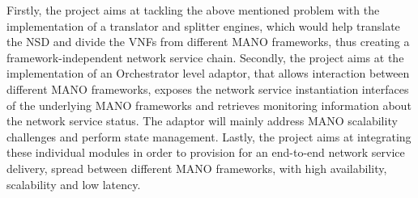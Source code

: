 Firstly, the project aims at tackling the above mentioned problem with the implementation of a translator and splitter engines, which would help translate the NSD and divide the VNFs from different MANO frameworks, thus creating a framework-independent network service chain. Secondly, the project aims at the implementation of an Orchestrator level adaptor, that allows interaction between different MANO frameworks, exposes the network service instantiation interfaces of the underlying MANO frameworks and retrieves monitoring information about the network service status. The adaptor will mainly address MANO scalability challenges and perform state management. Lastly, the project aims at integrating these individual modules in order to provision for an end-to-end network service delivery, spread between different MANO frameworks, with high availability, scalability and low latency.


